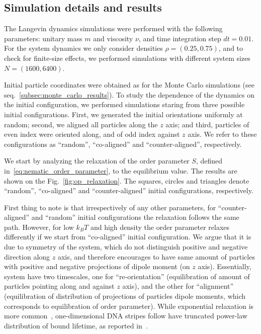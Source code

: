 \subsection{Simulation details and results}
\label{subsec:molecular_dynamics_results}

The Langevin dynamics simulations were performed with the following parameters: unitary mass $m$ and viscosity $\nu$, and time integration step $d t = 0.01$. For the system dynamics we only consider densities $\rho = (0.25, 0.75)$, and to check for finite-size effects, we performed simulations with different system sizes $N = (1600, 6400)$.

Initial particle coordinates were obtained as for the Monte Carlo simulations (see seq.~\ref{subsec:monte_carlo_results}). To study the dependence of the dynamics on the initial configuration, we performed simulations staring from three possible initial configurations. First, we generated the initial orientations uniformly at random; second,  we aligned all particles along the $z$ axis; and third, particles of even index were oriented along, and of odd index against $z$ axis. We refer to these configurations as ``random'', ``co-aligned'' and ``counter-aligned'', respectively.

We start by analyzing the relaxation of the order parameter $S$, defined in~\eqref{eq:nematic_order_parameter}, to the equilibrium value. The results are shown on the Fig.~\ref{fig:op_relaxation}. The squares, circles and triangles denote ``random'', ``co-aligned'' and ``counter-aligned'' initial configurations, respectively.

First thing to note is that irrespectively of any other parameters, for ``counter-aligned'' and ``random'' initial configurations the relaxation follows the same path. However, for low $k_BT$ and high density the order parameter relaxes differently if we start from ``co-aligned'' initial configuration. We argue that it is due to symmetry of the system, which do not distinguish positive and negative direction along $z$ axis, and therefore encourages to have same amount of particles with positive and negative projections of dipole moment (on $z$ axis). Essentially, system have two timescales, one for ``re-orientation'' (equilibration of amount of particles pointing along and against $z$ axis), and the other for ``alignment'' (equilibration of distribution of projections of particles dipole moments, which corresponds to equilibration of order parameter).
While exponential relaxation is more common~\cite{C5SM02754C}, one-dimensional DNA stripes follow have truncated power-law distribution of bound lifetime, as reported in~\cite{Rogers2013}.

